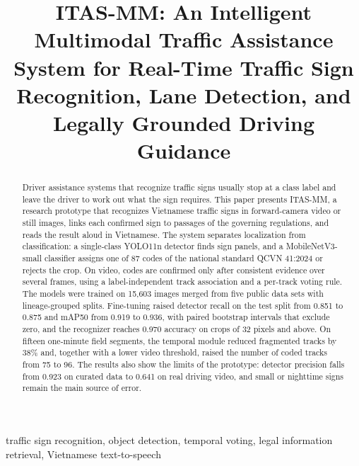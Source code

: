 \documentclass[conference,a4paper]{IEEEtran}
\begin{document}
\title{ITAS-MM: An Intelligent Multimodal Traffic Assistance System for Real-Time Traffic Sign Recognition, Lane Detection, and Legally Grounded Driving Guidance}

\author{
}

\maketitle

\begin{abstract}
Driver assistance systems that recognize traffic signs usually stop at a class label and leave the driver to work out what the sign requires. This paper presents ITAS-MM, a research prototype that recognizes Vietnamese traffic signs in forward-camera video or still images, links each confirmed sign to passages of the governing regulations, and reads the result aloud in Vietnamese. The system separates localization from classification: a single-class YOLO11n detector finds sign panels, and a MobileNetV3-small classifier assigns one of 87 codes of the national standard QCVN 41:2024 or rejects the crop. On video, codes are confirmed only after consistent evidence over several frames, using a label-independent track association and a per-track voting rule. The models were trained on 15,603 images merged from five public data sets with lineage-grouped splits. Fine-tuning raised detector recall on the test split from 0.851 to 0.875 and mAP50 from 0.919 to 0.936, with paired bootstrap intervals that exclude zero, and the recognizer reaches 0.970 accuracy on crops of 32 pixels and above. On fifteen one-minute field segments, the temporal module reduced fragmented tracks by 38\% and, together with a lower video threshold, raised the number of coded tracks from 75 to 96. The results also show the limits of the prototype: detector precision falls from 0.923 on curated data to 0.641 on real driving video, and small or nighttime signs remain the main source of error.
\end{abstract}

\begin{IEEEkeywords}
traffic sign recognition, object detection, temporal voting, legal information retrieval, Vietnamese text-to-speech
\end{IEEEkeywords}
\end{document}
